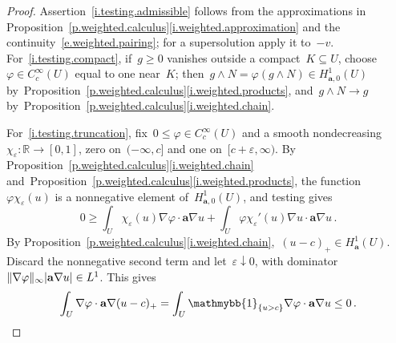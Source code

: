 \documentclass[11pt,letterpaper]{article}
\numberwithin{equation}{section}
\theoremstyle{definition}
\newcommand{\R}{\mathbb{R}}
\renewcommand{\a}{\mathbf{a}}
\newcommand{\eps}{\varepsilon}
\DeclarePairedDelimiter{\norm}{\lVert}{\rVert}
\renewcommand{\subset}{\subseteq}
\newcommand{\indc}{{\mathmybb{1}}}
\newcommand{\Hzero}[1]{H^1_{#1,0}}
\begin{document}
\begin{proof}
Assertion~\ref{i.testing.admissible} follows from the approximations in Proposition~\ref{p.weighted.calculus}\ref{i.weighted.approximation} and the continuity~\eqref{e.weighted.pairing}; for a supersolution apply it to~$-v$. For~\ref{i.testing.compact}, if~$g\geq0$ vanishes outside a compact~$K\subset U$, choose~$\varphi\in C^\infty_c(U)$ equal to one near~$K$; then~$g\wedge N=\varphi(g\wedge N)\in\Hzero{\a}(U)$ by~Proposition~\ref{p.weighted.calculus}\ref{i.weighted.products}, and~$g\wedge N\to g$ by~Proposition~\ref{p.weighted.calculus}\ref{i.weighted.chain}.

\smallskip

For~\ref{i.testing.truncation}, fix~$0\leq\varphi\in C^\infty_c(U)$ and a smooth nondecreasing~$\chi_\eps:\R\to[0,1]$, zero on~$(-\infty,c]$ and one on~$[c+\eps,\infty)$. By Proposition~\ref{p.weighted.calculus}\ref{i.weighted.chain} and~Proposition~\ref{p.weighted.calculus}\ref{i.weighted.products}, the function~$\varphi\chi_\eps(u)$ is a nonnegative element of~$\Hzero{\a}(U)$, and testing gives
\begin{equation*}
	0\geq\int_U\chi_\eps(u)\nabla\varphi\cdot\a\nabla u+\int_U\varphi\chi_\eps'(u)\nabla u\cdot\a\nabla u\,.
\end{equation*}
By Proposition~\ref{p.weighted.calculus}\ref{i.weighted.chain},~$(u-c)_+\in H^1_\a(U)$. Discard the nonnegative second term and let~$\eps\downarrow0$, with dominator~$\norm{\nabla\varphi}_\infty|\a\nabla u|\in L^1$. This gives
\begin{equation*}
	\int_U\nabla\varphi\cdot\a\nabla(u-c)_+=\int_U\indc_{\{u>c\}}\nabla\varphi\cdot\a\nabla u\leq0\,.
\end{equation*}

\smallskip


\end{proof}
\end{document}
